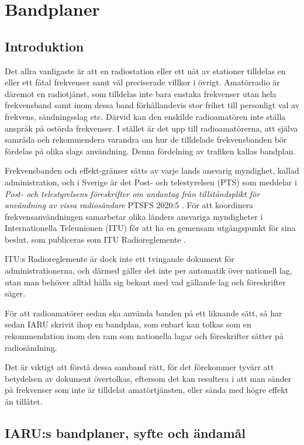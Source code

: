 \section{Bandplaner}
\label{bandplaner}

\subsection{Introduktion}

Det allra vanligaste är att en radiostation eller ett nät av stationer tilldelas
en eller ett fåtal frekvenser samt väl preciserade villkor i övrigt.
Amatörradio är däremot en radiotjänst, som tilldelas inte bara enstaka
frekvenser utan hela frekvensband samt inom dessa band förhållandevis stor
frihet till personligt val av frekvens, sändningsslag etc.
Därvid kan den enskilde radioamatören inte ställa anspråk på ostörda frekvenser.
I stället är det upp till radioamatörerna, att själva samråda och rekommendera
varandra om hur de tilldelade frekvensbanden bör fördelas på olika slags
användning.
Denna fördelning av trafiken kallas bandplan.

Frekvensbanden och effekt-gränser sätts av varje lands ansvarig myndighet,
kallad administration, och i Sverige är det Post- och telestyrelsen (PTS) som
meddelar i \emph{Post- och telestyrelsens föreskrifter om undantag från
tillståndsplikt för användning av vissa radiosändare} PTSFS 2020:5
\cite{PTSFS2020:5}.
För att koordinera frekvensanvändningen samarbetar olika länders ansvariga
myndigheter i Internationella Teleunionen (ITU) för att ha en gemensam
utgångspunkt för sina beslut, som publiceras som
ITU Radioreglemente \cite{ITU-RR}.

ITU:s Radioreglemente är dock inte ett tvingande dokument för
administrationerna, och därmed gäller det inte per automatik över
nationell lag, utan man behöver alltid hålla sig bekant med vad gällande lag
och föreskrifter säger.

För att radioamatörer sedan ska använda banden på ett liknande sätt, så har
sedan IARU skrivit ihop en bandplan, som enbart kan tolkas som en rekommendation
inom den ram som nationella lagar och föreskrifter sätter på radiosändning.

Det är viktigt att förstå dessa samband rätt, för det förekommer tyvärr att
betydelsen av dokument övertolkas, eftersom det kan resultera i att man sänder
på frekvenser som inte är tilldelat amatörtjänsten, eller sända med högre
effekt än tillåtet.

\subsection{IARU:s bandplaner, syfte och ändamål}

